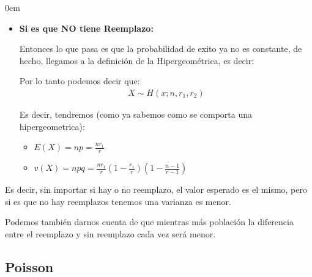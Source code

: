 \documentclass[12pt, fleqn]{report}                             %
\newenvironment{SmallIndentation}[1][0.75em]                    %
        {\begin{adjustwidth}{#1}{}\begin{footnotesize}}             %
        {\end{footnotesize}\end{adjustwidth}}                       %
\theoremstyle{break}                                            %
\newcommand{\Wrap}[1]{\left( #1 \right)}                        %
\begin{document}
\begin{multicols*}{2}
\begin{SmallIndentation}[0em]
\begin{itemize}
                            \item 
                                \textbf{Si es que NO tiene Reemplazo:}

                                Entonces lo que pasa es que la probabilidad de exito ya no es constante,
                                de hecho, llegamos a la definición de la Hipergeométrica, es decir:

                                Por lo tanto podemos decir que:
                                \begin{align*}
                                    X \sim H(x; n, r_1, r_2)
                                \end{align*}

                                Es decir, tendremos (como ya sabemos como se comporta una hipergeometrica):
                                \begin{itemize}
                                    \item $E(X) = np = \frac{nr_1}{r}$
                                    \item $v(X) = npq = \frac{nr_1}{r}\Wrap{1 - \frac{r_1}{r}}\Wrap{1 - \frac{n-1}{r-1}}$
                                \end{itemize}

                        \end{itemize}

                        Es decir, sin importar si hay o no reemplazo, el valor esperado es el mismo, pero
                        si es que no hay reemplazos tenemos una varianza es menor.

                        Podemos también darnos cuenta de que mientras más población la diferencia entre
                        el reemplazo y sin reemplazo cada vez será menor.


                \end{SmallIndentation}
                \end{multicols*}



            \clearpage
            \subsection{Poisson}
\end{document}
